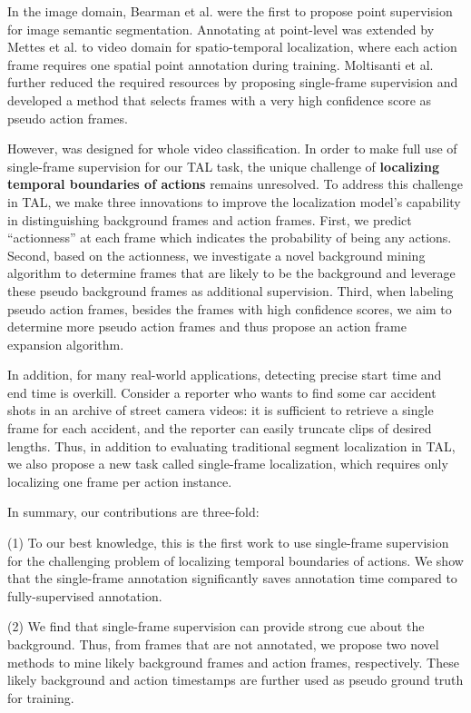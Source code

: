 \documentclass[runningheads]{llncs}
\begin{document}
	In the image domain, Bearman et al. \cite{bearman2016s} were the first to propose point supervision for image semantic segmentation. Annotating at point-level was extended by Mettes et al. \cite{mettes2016spot} to video domain for spatio-temporal localization, where each action frame requires one spatial point annotation during training. 
	Moltisanti et al. \cite{moltisanti2019action} further reduced the required resources by proposing single-frame supervision and developed a method that selects frames with a very high confidence score as pseudo action frames.
	
However, \cite{moltisanti2019action} was designed for whole video classification. In order to make full use of single-frame supervision for our TAL task, the unique challenge of \textbf{localizing temporal boundaries of actions} remains unresolved.
	To address this challenge in TAL, we make three innovations to improve the localization model's capability in distinguishing background frames and action frames.
	First, we predict ``actionness'' at each frame which indicates the probability of being any actions. 
	Second, based on the actionness, we investigate a novel background mining algorithm to determine frames that are likely to be the background and leverage these pseudo background frames as additional supervision.
	Third, when labeling pseudo action frames, besides the frames with high confidence scores, we aim to determine more pseudo action frames and thus propose an action frame expansion algorithm.
	
	In addition, for many real-world applications, detecting precise start time and end time is overkill. Consider a reporter who wants to find some car accident shots in an archive of street camera videos: it is sufficient to retrieve a single frame for each accident, and the reporter can easily truncate clips of desired lengths.
	Thus, in addition to evaluating traditional segment localization in TAL, we also propose a new task called single-frame localization, which requires only localizing one frame per action instance.
	
	In summary, our contributions are three-fold:
	
	(1) To our best knowledge, this is the first work to use single-frame supervision for the challenging problem of localizing temporal boundaries of actions. 
	We show that the single-frame annotation significantly saves annotation time compared to fully-supervised annotation.
	


	(2) We find that single-frame supervision can provide strong cue about the background. Thus, from frames that are not annotated, we propose two novel methods to mine likely background frames and action frames, respectively. These likely background and action timestamps are further used as pseudo ground truth for training.
	
\end{document}
